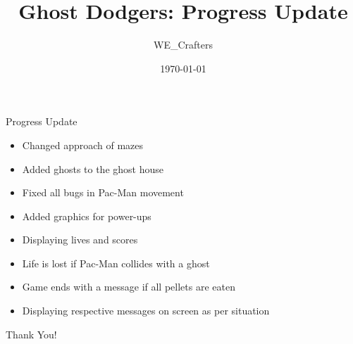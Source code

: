 \documentclass{beamer}
\title{Ghost Dodgers: Progress Update}
\author{WE\_Crafters}
\date{\today}
\begin{document}
\frame{\titlepage}

\begin{frame}{Progress Update}
\begin{itemize}
    \item Changed approach of mazes
    \item Added ghosts to the ghost house
    \item Fixed all bugs in Pac-Man movement
    \item Added graphics for power-ups
    \item Displaying lives and scores
    \item Life is lost if Pac-Man collides with a ghost
    \item Game ends with a message if all pellets are eaten
    \item Displaying respective messages on screen as per situation
\end{itemize}
\end{frame}

\begin{frame}
    \centering
    \vfill
    \Huge Thank You!
    \vfill
\end{frame}
\end{document}
